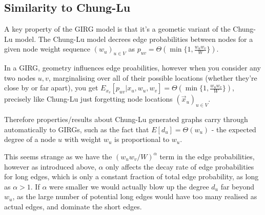
\subsection{Similarity to Chung-Lu} 
A key property of the GIRG model is that it's a geometic variant of the Chung-Lu model. The Chung-Lu model decrees edge probabilities between nodes for a given node weight sequence $(w_u)_{u \in V}$ as $p_{uv} = \Theta(\min\{1, \frac{w_u w_v}{W}\})$.


In a GIRG, geometry influences edge proabilities, however when you consider any two nodes $u,v$, marginalising over all of their possible locations (whether they're close by or far apart), you get $E_{x_v}[p_{uv} | x_u, w_u, w_v] = \Theta(\min\{1, \frac{w_u w_v}{W} \})$, precisely like Chung-Lu just forgetting node locations $(\vec{x}_u)_{u \in V}$.

Therefore properties/results about Chung-Lu generated graphs carry through automatically to GIRGs, such as the fact that $E[d_u] = \Theta(w_u)$ - the expected degree of a node $u$ with weight $w_u$ is proportional to $w_u$.

This seems strange as we have the $(w_u w_v / W)^\alpha$ term in the edge probabilities, however as introduced above, $\alpha$ only affects the decay rate of edge probabilities for long edges, which is only a constant fraction of total edge probability, as long as $\alpha > 1$. If $\alpha$ were smaller we would actually blow up the degree $d_u$ far beyond $w_u$, as the large number of potential long edges would have too many realised as actual edges, and dominate the short edges.

